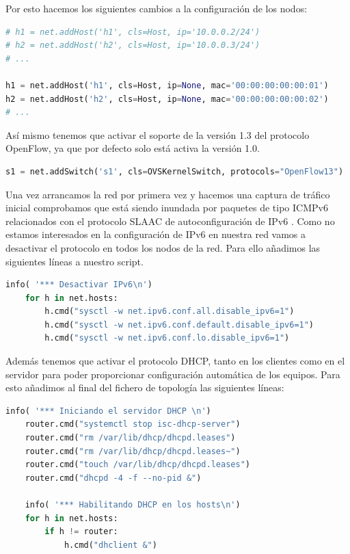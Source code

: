 Por esto hacemos los siguientes cambios a la configuración de los nodos:

\begin{lstlisting}[language=python, label=lst:miniedit-host, caption={Determinación de las direcciones MAC en los hosts Mininet}]
# h1 = net.addHost('h1', cls=Host, ip='10.0.0.2/24')
# h2 = net.addHost('h2', cls=Host, ip='10.0.0.3/24')
# ...

h1 = net.addHost('h1', cls=Host, ip=None, mac='00:00:00:00:00:01')
h2 = net.addHost('h2', cls=Host, ip=None, mac='00:00:00:00:00:02')
# ...

\end{lstlisting}

Así mismo tenemos que activar el soporte de la versión 1.3 del protocolo OpenFlow, ya que por defecto solo está activa la versión 1.0.

\begin{lstlisting}[language=python, label=lst:miniedit-switch, caption={Activación del protocolo OF1.3 en switch Mininet}]
s1 = net.addSwitch('s1', cls=OVSKernelSwitch, protocols="OpenFlow13")
\end{lstlisting}

Una vez arrancamos la red por primera vez y hacemos una captura de tráfico inicial comprobamos que está siendo inundada por paquetes de tipo ICMPv6 relacionados con el protocolo SLAAC de autoconfiguración de IPv6 \cite{rfc4862}. Como no estamos interesados en la configuración de IPv6 en nuestra red vamos a desactivar el protocolo en todos los nodos de la red. Para ello añadimos las siguientes líneas a nuestro script.

\begin{lstlisting}[language=python, label=lst:miniedit-ipv6, caption={Desactivación de IPv6 en nodos Mininet (Linux)}]
    info( '*** Desactivar IPv6\n')
    for h in net.hosts:
        h.cmd("sysctl -w net.ipv6.conf.all.disable_ipv6=1")
        h.cmd("sysctl -w net.ipv6.conf.default.disable_ipv6=1")
        h.cmd("sysctl -w net.ipv6.conf.lo.disable_ipv6=1")
\end{lstlisting}

Además tenemos que activar el protocolo DHCP, tanto en los clientes como en el servidor para poder proporcionar configuración automática de los equipos. Para esto añadimos al final del fichero de topología las siguientes líneas:

\begin{lstlisting}[language=python, label=lst:miniedit-dhcp, caption={Activación del servidor y clientes DHCP al arranque de la red.}]
info( '*** Iniciando el servidor DHCP \n')
    router.cmd("systemctl stop isc-dhcp-server")
    router.cmd("rm /var/lib/dhcp/dhcpd.leases")
    router.cmd("rm /var/lib/dhcp/dhcpd.leases~")
    router.cmd("touch /var/lib/dhcp/dhcpd.leases")
    router.cmd("dhcpd -4 -f --no-pid &")
    
    info( '*** Habilitando DHCP en los hosts\n')
    for h in net.hosts:
    	if h != router:
        	h.cmd("dhclient &")
\end{lstlisting}


